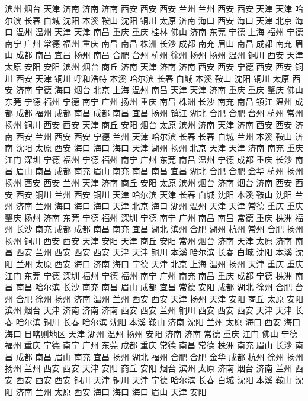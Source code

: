 滨州
烟台
天津
济南
济南
济南
西安
西安
西安
兰州
兰州
西安
西安
天津
天津
哈尔滨
长春
白城
沈阳
本溪
鞍山
沈阳
铜川
太原
济南
海口
西安
海口
天津
北京
海口
温州
温州
天津
天津
南昌
重庆
重庆
桂林
佛山
济南
东莞
宁德
上海
福州
宁德
南宁
广州
常德
福州
重庆
南昌
南昌
株洲
长沙
成都
南充
眉山
南昌
成都
南充
眉山
成都
南昌
宜昌
扬州
南昌
合肥
台州
杭州
徐州
扬州
扬州
温州
铜川
西安
天津
太原
安阳
安阳
滨州
烟台
商丘
济南
天津
济南
济南
西安
西安
宁德
西安
西安
铜川
西安
天津
铜川
呼和浩特
本溪
哈尔滨
长春
白城
本溪
鞍山
沈阳
铜川
太原
西安
济南
宁德
海口
烟台
北京
上海
温州
南昌
天津
天津
济南
重庆
重庆
肇庆
佛山
东莞
宁德
福州
宁德
南宁
广州
扬州
重庆
南昌
株洲
长沙
南充
南昌
镇江
温州
成都
成都
福州
成都
南昌
成都
南昌
宜昌
扬州
镇江
湖北
合肥
合肥
台州
杭州
常州
扬州
铜川
西安
西安
天津
商丘
安阳
烟台
太原
滨州
济南
天津
济南
西安
西安
济南
西安
兰州
西安
西安
宁德
兰州
天津
哈尔滨
长春
长春
白城
兰州
本溪
鞍山
济南
沈阳
太原
西安
海口
海口
海口
天津
湖州
扬州
北京
天津
天津
济南
南充
重庆
江门
深圳
宁德
福州
宁德
福州
南宁
广州
东莞
南昌
温州
宁德
成都
重庆
长沙
南昌
眉山
南昌
成都
南充
眉山
南充
南昌
南昌
宜昌
湖北
合肥
合肥
金华
杭州
扬州
扬州
西安
西安
兰州
天津
济南
商丘
安阳
太原
滨州
烟台
济南
烟台
济南
西安
西安
西安
铜川
兰州
西安
铜川
天津
哈尔滨
天津
长春
白城
沈阳
本溪
鞍山
沈阳
兰州
济南
兰州
海口
海口
海口
天津
北京
海口
湖州
温州
天津
天津
常德
重庆
重庆
肇庆
扬州
济南
东莞
宁德
福州
深圳
宁德
南宁
广州
南昌
南昌
常德
重庆
株洲
福州
长沙
南充
成都
成都
南昌
南充
宜昌
湖北
滨州
合肥
湖州
杭州
常州
合肥
扬州
扬州
铜川
西安
西安
天津
安阳
天津
商丘
安阳
常州
烟台
济南
天津
太原
济南
南昌
西安
兰州
西安
西安
西安
天津
天津
铜川
本溪
哈尔滨
长春
白城
沈阳
本溪
沈阳
兰州
太原
西安
海口
济南
海口
宁德
天津
北京
上海
温州
扬州
天津
重庆
重庆
江门
东莞
宁德
深圳
福州
宁德
福州
南宁
广州
南充
南昌
重庆
成都
宁德
株洲
南昌
南昌
哈尔滨
长沙
南充
南昌
眉山
成都
宜昌
常德
安阳
成都
湖北
徐州
合肥
台州
合肥
徐州
扬州
济南
温州
兰州
西安
西安
天津
扬州
天津
安阳
商丘
太原
安阳
滨州
烟台
天津
济南
济南
济南
西安
西安
兰州
铜川
西安
西安
西安
天津
天津
长春
哈尔滨
铜川
长春
哈尔滨
沈阳
本溪
鞍山
济南
沈阳
兰州
太原
海口
西安
海口
海口
日喀则地区
天津
湖州
温州
扬州
安阳
济南
济南
常德
重庆
江门
佛山
宁德
福州
重庆
宁德
南宁
广州
东莞
成都
重庆
常德
南昌
常德
株洲
南充
眉山
长沙
南昌
成都
南昌
眉山
南充
宜昌
扬州
湖北
福州
合肥
合肥
金华
成都
杭州
徐州
扬州
扬州
兰州
西安
西安
天津
安阳
商丘
安阳
烟台
滨州
太原
济南
烟台
济南
兰州
西安
西安
西安
西安
铜川
天津
铜川
天津
宁德
哈尔滨
长春
白城
沈阳
本溪
鞍山
沈阳
济南
兰州
太原
西安
海口
海口
海口
眉山
天津
安阳

